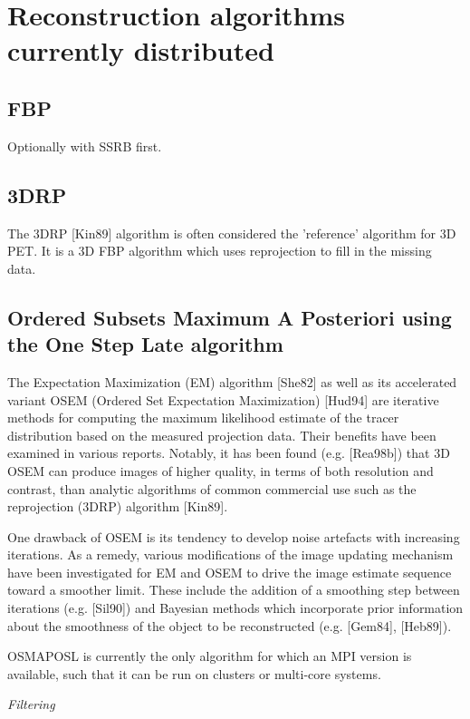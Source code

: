 \documentclass{article}
\begin{document}
\section{
Reconstruction algorithms currently distributed}

\subsection{FBP}
Optionally with SSRB first.

\subsection{3DRP}
The 3DRP [Kin89] algorithm is often considered the 'reference' 
algorithm for 3D PET. It is a 3D FBP algorithm which uses reprojection 
to fill in the missing data.

\subsection{
Ordered Subsets Maximum A Posteriori using the One Step Late 
algorithm}

The Expectation Maximization (EM) algorithm [She82] as well as 
its accelerated variant OSEM (Ordered Set Expectation Maximization) 
[Hud94] are iterative methods for computing the maximum likelihood 
estimate of the tracer distribution based on the measured projection 
data. Their benefits have been examined in various reports. Notably, 
it has been found (e.g. [Rea98b]) that 3D OSEM can produce images 
of higher quality, in terms of both resolution and contrast, 
than analytic algorithms of common commercial use such as the 
reprojection (3DRP) algorithm [Kin89].

One drawback of OSEM is its tendency to develop noise artefacts 
with increasing iterations. As a remedy, various modifications 
of the image updating mechanism have been investigated for EM 
and OSEM to drive the image estimate sequence toward a smoother 
limit. These include the addition of a smoothing step between 
iterations (e.g. [Sil90]) and Bayesian methods which incorporate 
prior information about the smoothness of the object to be reconstructed 
(e.g. [Gem84], [Heb89]).

OSMAPOSL is currently the only algorithm for which an MPI version is 
available, such that it can be run on clusters or multi-core systems.

\begin{spacing}{1.5}
\textit{Filtering}


\end{spacing}
\end{document}
